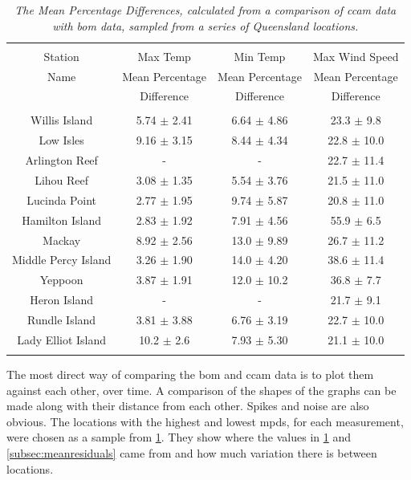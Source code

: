 \begin{table}[tbh!]
	\caption{\textsl{ The Mean Percentage Differences, calculated from a comparison of \gls{ccam} data with \gls{bom} data, sampled from a series of Queensland locations. }}
	\centering
		\begin{tabular}{c c c c} \\
			\hline 	\\ 	[-1ex]
			Station	&	Max Temp			&	Min Temp			&	Max Wind Speed		\\	
			Name	&	Mean Percentage		&	Mean Percentage		&	Mean Percentage		\\	
					&	Difference			&	Difference			&	Difference			\\	[1ex]
			\hline	\\	[-1ex]												
			Willis Island		&	5.74 $\pm$ 2.41		&	6.64 $\pm$ 4.86		&	23.3 $\pm$ 9.8		\\	
			Low Isles			&	9.16 $\pm$ 3.15		&	8.44 $\pm$ 4.34		&	22.8 $\pm$ 10.0		\\	
			Arlington Reef		&	-					&	-	 	 			&	22.7 $\pm$ 11.4		\\	
			Lihou Reef			&	3.08 $\pm$ 1.35		&	5.54 $\pm$ 3.76		&	21.5 $\pm$ 11.0		\\	
			Lucinda Point		&	2.77 $\pm$ 1.95		&	9.74 $\pm$ 5.87		&	20.8 $\pm$ 11.0		\\	
			Hamilton Island		&	2.83 $\pm$ 1.92		&	7.91 $\pm$ 4.56		&	55.9 $\pm$ 6.5		\\	
			Mackay				&	8.92 $\pm$ 2.56		&	13.0 $\pm$ 9.89		&	26.7 $\pm$ 11.2		\\	
			Middle Percy Island	&	3.26 $\pm$ 1.90		&	14.0 $\pm$ 4.20		&	38.6 $\pm$ 11.4		\\	
			Yeppoon				&	3.87 $\pm$ 1.91		&	12.0 $\pm$ 10.2		&	36.8 $\pm$ 7.7		\\	
			Heron Island		&	-					&	-		 			&	21.7 $\pm$ 9.1		\\	
			Rundle Island		&	3.81 $\pm$ 3.88		&	6.76 $\pm$ 3.19		&	22.7 $\pm$ 10.0		\\	
			Lady Elliot Island	&	10.2 $\pm$ 2.6		&	7.93 $\pm$ 5.30		&	21.1 $\pm$ 10.0		\\	[1ex]
			\hline \\
		\end{tabular}
	\label{tab:bompercdiff}
\end{table}

The most direct way of comparing the \gls{bom} and \gls{ccam} data is to plot them against each other, over time. A comparison of the shapes of the graphs can be made along with their distance from each other. Spikes and noise are also obvious. The locations with the highest and lowest \gls{mpd}s, for each measurement, were chosen as a sample from \cref{tab:bompercdiff}. They show where the values in \cref{tab:bompercdiff} and \cref{subsec:meanresiduals} came from and how much variation there is between locations. 

